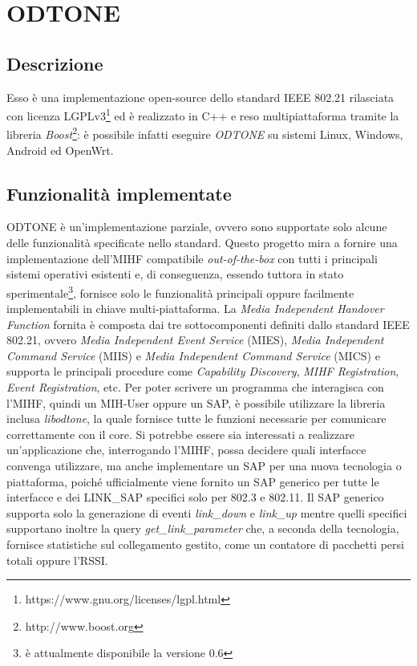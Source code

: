 \chapter{ODTONE}

\section{Descrizione}
Esso è una implementazione open-source dello standard IEEE 802.21 rilasciata con licenza LGPLv3\footnote{https://www.gnu.org/licenses/lgpl.html} ed è realizzato in C++ e reso multipiattaforma tramite la libreria {\em Boost}\footnote{http://www.boost.org}: è possibile infatti eseguire {\em ODTONE} su sistemi Linux, Windows, Android ed OpenWrt.

\section{Funzionalità implementate}

ODTONE è un'implementazione parziale, ovvero sono supportate solo alcune delle funzionalità specificate nello standard. Questo progetto mira a fornire una implementazione dell'MIHF compatibile {\em out-of-the-box} con tutti i principali sistemi operativi esistenti e, di conseguenza, essendo tuttora in stato sperimentale\footnote{è attualmente disponibile la versione 0.6}, fornisce solo le funzionalità principali oppure facilmente implementabili in chiave multi-piattaforma.
La {\em Media Independent Handover Function} fornita è composta dai tre sottocomponenti definiti dallo standard IEEE 802.21, ovvero {\em Media Independent Event Service} (MIES), {\em Media Independent Command Service} (MIIS) e {\em Media Independent Command Service} (MICS) e supporta le principali procedure come {\em Capability Discovery}, {\em MIHF Registration}, {\em Event Registration}, etc. Per poter scrivere un programma che interagisca con l'MIHF, quindi un MIH-User oppure un SAP, è possibile utilizzare la libreria inclusa {\em libodtone}, la quale fornisce tutte le funzioni necessarie per comunicare correttamente con il core. Si potrebbe essere sia interessati a realizzare un'applicazione che, interrogando l'MIHF, possa decidere quali interfacce convenga utilizzare, ma anche implementare un SAP per una nuova tecnologia o piattaforma, poiché ufficialmente viene fornito un SAP generico per tutte le interfacce e dei LINK\_SAP specifici solo per 802.3 e 802.11. Il SAP generico supporta solo la generazione di eventi {\em link\_down} e {\em link\_up} mentre quelli specifici supportano inoltre la query {\em get\_link\_parameter} che, a seconda della tecnologia, fornisce statistiche sul collegamento gestito, come un contatore di pacchetti persi totali oppure l'RSSI.

